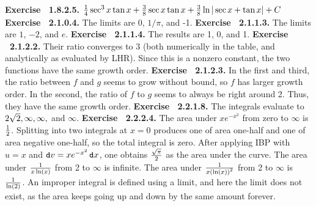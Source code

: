  {\noindent \protect \bf  Exercise ~1.8.2.5.} $\protect \frac  {1}{4}\protect \qopname  \relax o{sec}^3{x}\protect \qopname  \relax o{tan}{x} +\protect \frac  {3}{8} \protect \qopname  \relax o{sec}{x}\protect \qopname  \relax o{tan}{x}+\protect \frac  {3}{8} \protect \qopname  \relax o{ln}{|\protect \qopname  \relax o{sec}{x}+\protect \qopname  \relax o{tan}{x}|}+C$ \protect \newline  \protect \newline  
 {\noindent \protect \bf  Exercise ~2.1.0.4.} The limits are 0, $1/\pi $, and -1.  \protect \newline  \protect \newline  
 {\noindent \protect \bf  Exercise ~2.1.1.3.} The limits are $1$, $-2$, and $e$.  \protect \newline  \protect \newline  
 {\noindent \protect \bf  Exercise ~2.1.1.4.} The results are 1, 0, and 1. \protect \newline  \protect \newline  
 {\noindent \protect \bf  Exercise ~2.1.2.2.} Their ratio converges to 3 (both numerically in the table, and analytically as evaluated by LHR). Since this is a nonzero constant, the two functions have the same growth order. \protect \newline  \protect \newline  
 {\noindent \protect \bf  Exercise ~2.1.2.3.} In the first and third, the ratio between $f$ and $g$ seems to grow without bound, so $f$ has larger growth order. In the second, the ratio of $f$ to $g$ seems to always be right around 2. Thus, they have the same growth order. \protect \newline  \protect \newline  
 {\noindent \protect \bf  Exercise ~2.2.1.8.} The integrals evaluate to $2\protect \sqrt  {2},\infty ,\infty ,$ and $\infty $. \protect \newline  \protect \newline  
 {\noindent \protect \bf  Exercise ~2.2.2.4.} \textbullet The area under $xe^{-x^2}$ from zero to $\infty $ is $\protect \frac  {1}{2}$. \textbullet Splitting into two integrals at $x=0$ produces one of area one-half and one of area negative one-half, so the total integral is zero. \textbullet After applying IBP with $u=x$ and $\mathop {}\protect \tmspace  -\thinmuskip {.1667em}\protect \mathtt  {d}v = xe^{-x^2}\mathop {}\protect \tmspace  -\thinmuskip {.1667em}\protect \mathtt  {d}x$, one obtains $\protect \frac  {\protect \sqrt  {\pi }}{2}$ as the area under the curve. \textbullet The area under $\protect \frac  {1}{x\protect \qopname  \relax o{ln}(x)}$ from 2 to $\infty $ is infinite. \textbullet The area under $\protect \frac  {1}{x\left (\protect \qopname  \relax o{ln}(x)\right )^2}$ from 2 to $\infty $ is $\protect \frac  {1}{\protect \qopname  \relax o{ln}(2)}$. \textbullet An improper integral is defined using a limit, and here the limit does not exist, as the area keeps going up and down by the same amount forever. \protect \newline  \protect \newline  
